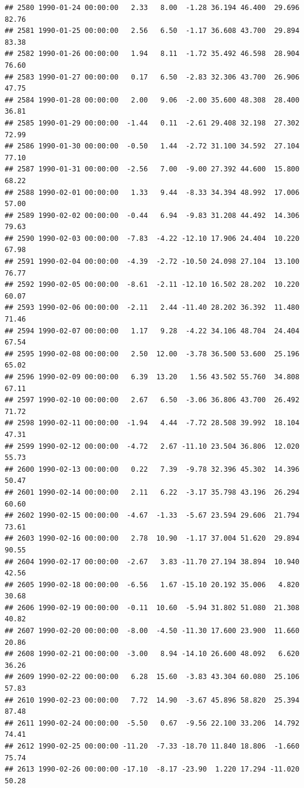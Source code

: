 \documentclass{article}\usepackage{graphicx, color}
\makeatletter
\newenvironment{kframe}{%
 \def\at@end@of@kframe{}%
 \ifinner\ifhmode%
  \def\at@end@of@kframe{\end{minipage}}%
  \begin{minipage}{\columnwidth}%
 \fi\fi%
 \def\FrameCommand##1{\hskip\@totalleftmargin \hskip-\fboxsep
 \colorbox{shadecolor}{##1}\hskip-\fboxsep
     \hskip-\linewidth \hskip-\@totalleftmargin \hskip\columnwidth}%
 \MakeFramed {\advance\hsize-\width
   \@totalleftmargin\z@ \linewidth\hsize
   \@setminipage}}%
 {\par\unskip\endMakeFramed%
 \at@end@of@kframe}
\newenvironment{knitrout}{}{} %
\makeatother
\begin{document}
\begin{knitrout}
\begin{kframe}
\begin{verbatim}
## 2580 1990-01-24 00:00:00   2.33   8.00  -1.28 36.194 46.400  29.696  82.76
## 2581 1990-01-25 00:00:00   2.56   6.50  -1.17 36.608 43.700  29.894  83.38
## 2582 1990-01-26 00:00:00   1.94   8.11  -1.72 35.492 46.598  28.904  76.60
## 2583 1990-01-27 00:00:00   0.17   6.50  -2.83 32.306 43.700  26.906  47.75
## 2584 1990-01-28 00:00:00   2.00   9.06  -2.00 35.600 48.308  28.400  36.81
## 2585 1990-01-29 00:00:00  -1.44   0.11  -2.61 29.408 32.198  27.302  72.99
## 2586 1990-01-30 00:00:00  -0.50   1.44  -2.72 31.100 34.592  27.104  77.10
## 2587 1990-01-31 00:00:00  -2.56   7.00  -9.00 27.392 44.600  15.800  68.22
## 2588 1990-02-01 00:00:00   1.33   9.44  -8.33 34.394 48.992  17.006  57.00
## 2589 1990-02-02 00:00:00  -0.44   6.94  -9.83 31.208 44.492  14.306  79.63
## 2590 1990-02-03 00:00:00  -7.83  -4.22 -12.10 17.906 24.404  10.220  67.98
## 2591 1990-02-04 00:00:00  -4.39  -2.72 -10.50 24.098 27.104  13.100  76.77
## 2592 1990-02-05 00:00:00  -8.61  -2.11 -12.10 16.502 28.202  10.220  60.07
## 2593 1990-02-06 00:00:00  -2.11   2.44 -11.40 28.202 36.392  11.480  71.46
## 2594 1990-02-07 00:00:00   1.17   9.28  -4.22 34.106 48.704  24.404  67.54
## 2595 1990-02-08 00:00:00   2.50  12.00  -3.78 36.500 53.600  25.196  65.02
## 2596 1990-02-09 00:00:00   6.39  13.20   1.56 43.502 55.760  34.808  67.11
## 2597 1990-02-10 00:00:00   2.67   6.50  -3.06 36.806 43.700  26.492  71.72
## 2598 1990-02-11 00:00:00  -1.94   4.44  -7.72 28.508 39.992  18.104  47.31
## 2599 1990-02-12 00:00:00  -4.72   2.67 -11.10 23.504 36.806  12.020  55.73
## 2600 1990-02-13 00:00:00   0.22   7.39  -9.78 32.396 45.302  14.396  50.47
## 2601 1990-02-14 00:00:00   2.11   6.22  -3.17 35.798 43.196  26.294  60.60
## 2602 1990-02-15 00:00:00  -4.67  -1.33  -5.67 23.594 29.606  21.794  73.61
## 2603 1990-02-16 00:00:00   2.78  10.90  -1.17 37.004 51.620  29.894  90.55
## 2604 1990-02-17 00:00:00  -2.67   3.83 -11.70 27.194 38.894  10.940  42.56
## 2605 1990-02-18 00:00:00  -6.56   1.67 -15.10 20.192 35.006   4.820  30.68
## 2606 1990-02-19 00:00:00  -0.11  10.60  -5.94 31.802 51.080  21.308  40.82
## 2607 1990-02-20 00:00:00  -8.00  -4.50 -11.30 17.600 23.900  11.660  20.86
## 2608 1990-02-21 00:00:00  -3.00   8.94 -14.10 26.600 48.092   6.620  36.26
## 2609 1990-02-22 00:00:00   6.28  15.60  -3.83 43.304 60.080  25.106  57.83
## 2610 1990-02-23 00:00:00   7.72  14.90  -3.67 45.896 58.820  25.394  87.48
## 2611 1990-02-24 00:00:00  -5.50   0.67  -9.56 22.100 33.206  14.792  74.41
## 2612 1990-02-25 00:00:00 -11.20  -7.33 -18.70 11.840 18.806  -1.660  75.74
## 2613 1990-02-26 00:00:00 -17.10  -8.17 -23.90  1.220 17.294 -11.020  50.28

\end{verbatim}
\end{kframe}
\end{knitrout}
\end{document}
